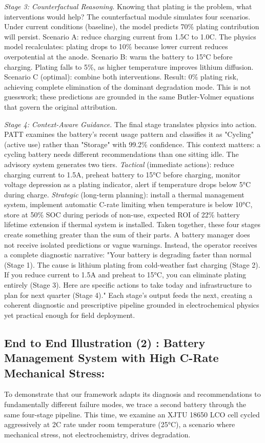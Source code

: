 \documentclass[5p,times,authoryear]{elsarticle}
\begin{document}
\emph{Stage 3: Counterfactual Reasoning.} Knowing that plating is the problem, what interventions would help? The counterfactual module simulates four scenarios. Under current conditions (baseline), the model predicts 70\% plating contribution will persist. Scenario A: reduce charging current from 1.5C to 1.0C. The physics model recalculates: plating drops to 10\% because lower current reduces overpotential at the anode. Scenario B: warm the battery to 15°C before charging. Plating falls to 5\%, as higher temperature improves lithium diffusion. Scenario C (optimal): combine both interventions. Result: 0\% plating risk, achieving complete elimination of the dominant degradation mode. This is not guesswork; these predictions are grounded in the same Butler-Volmer equations that govern the original attribution.

\emph{Stage 4: Context-Aware Guidance.} The final stage translates physics into action. PATT examines the battery's recent usage pattern and classifies it as "Cycling" (active use) rather than "Storage" with 99.2\% confidence. This context matters: a cycling battery needs different recommendations than one sitting idle. The advisory system generates two tiers. \emph{Tactical} (immediate actions): reduce charging current to 1.5A, preheat battery to 15°C before charging, monitor voltage depression as a plating indicator, alert if temperature drops below 5°C during charge. \emph{Strategic} (long-term planning): install a thermal management system, implement automatic C-rate limiting when temperature is below 10°C, store at 50\% SOC during periods of non-use, expected ROI of 22\% battery lifetime extension if thermal system is installed.
Taken together, these four stages create something greater than the sum of their parts. A battery manager does not receive isolated predictions or vague warnings. Instead, the operator receives a complete diagnostic narrative: "Your battery is degrading faster than normal (Stage 1). The cause is lithium plating from cold-weather fast charging (Stage 2). If you reduce current to 1.5A and preheat to 15°C, you can eliminate plating entirely (Stage 3). Here are specific actions to take today and infrastructure to plan for next quarter (Stage 4)." Each stage's output feeds the next, creating a coherent diagnostic and prescriptive pipeline grounded in electrochemical physics yet practical enough for field deployment.

\subsection{End to End Illustration (2) :  Battery Management System with High C-Rate Mechanical Stress:}
To demonstrate that our framework adapts its diagnosis and recommendations to fundamentally different failure modes, we trace a second battery through the same four-stage pipeline. This time, we examine an XJTU 18650 LCO cell cycled aggressively at 2C rate under room temperature (25°C), a scenario where mechanical stress, not electrochemistry, drives degradation.
\end{document}
